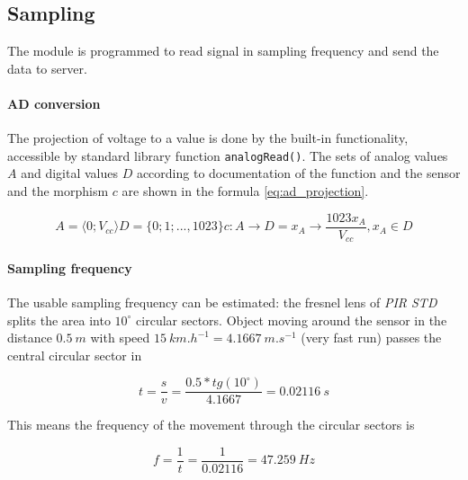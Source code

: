 \subsection*{Sampling}
The module is programmed to read signal in sampling frequency and send the data to server.

\paragraph{AD conversion}
The projection of voltage to a value is done by the built-in functionality, accessible by
standard library function \texttt{analogRead()}. The sets of analog values $A$ and digital values $D$
according to documentation of the function\cite{ArduinoAnalogRead} and the sensor\cite{PIROperationalManual}
and the morphism $c$ are shown in the formula \ref{eq:ad_projection}.

\begin{subequations}
\begin{equation}
A = \langle 0;V_{cc}\rangle
\end{equation}
\begin{equation}
D = \{0; 1; ..., 1023\}
\end{equation}
\begin{equation}
c: A \rightarrow D = x_A \rightarrow \frac{1023x_A}{V_{cc}}, x_A \in D
\end{equation}
\label{eq:ad_projection}
\end{subequations}

\paragraph{Sampling frequency}
The usable sampling frequency can be estimated: the fresnel lens of {\it PIR STD} splits the
area into $10^{\circ}$ circular sectors. Object moving around the sensor in the distance $0.5~m$
with speed $15~km.h^{-1} = 4.1667~m.s^{-1}$ (very fast run) passes the central circular sector in

\begin{equation}
t = \frac{s}{v} = \frac{0.5*tg(10^{\circ})}{4.1667} = 0.02116~s
\end{equation}

This means the frequency of the movement through the circular sectors is

\begin{equation}
f = \frac{1}{t} = \frac{1}{0.02116} = 47.259~Hz
\end{equation}

